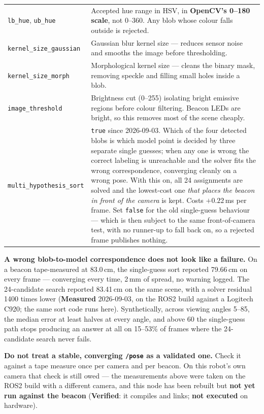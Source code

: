 \documentclass[11pt]{report}
\newenvironment{warningbox}%
  {\begin{lrbox}{\warnbox}\begin{minipage}{0.90\textwidth}}%
  {\end{minipage}\end{lrbox}%
   \begin{center}\fcolorbox{black}{codebg}{\usebox{\warnbox}}\end{center}}
\begin{document}
\begin{center}
\begin{tabular}{p{}p{}}
\texttt{lb\_hue}, \texttt{ub\_hue} & Accepted hue range in HSV, in \textbf{OpenCV's 0--180 scale}, not 0--360. Any blob whose colour falls outside is rejected. \\
\texttt{kernel\_size\_gaussian} & Gaussian blur kernel size --- reduces sensor noise and smooths the image before thresholding. \\
\texttt{kernel\_size\_morph} & Morphological kernel size --- cleans the binary mask, removing speckle and filling small holes inside a blob. \\
\texttt{image\_threshold} & Brightness cut (0--255) isolating bright emissive regions before colour filtering. Beacon LEDs are bright, so this removes most of the scene cheaply. \\
\texttt{multi\_hypothesis\_sort} & \texttt{true} since 2026-09-03. Which of the four detected blobs is which model point is decided by three separate single guesses; when any one is wrong the correct labeling is unreachable and the solver fits the wrong correspondence, converging cleanly on a wrong pose. With this on, all 24 assignments are solved and the lowest-cost one \emph{that places the beacon in front of the camera} is kept. Costs $+0.22$\,ms per frame. Set \texttt{false} for the old single-guess behaviour --- which is then subject to the same front-of-camera test, with no runner-up to fall back on, so a rejected frame publishes nothing. \\
\bottomrule
\end{tabular}
\end{center}

\begin{warningbox}
\textbf{A wrong blob-to-model correspondence does not look like a failure.}
On a beacon tape-measured at 83.0\,cm, the single-guess sort reported
79.66\,cm on every frame --- converging every time, 2\,mm of spread, no
warning logged. The 24-candidate search reported 83.41\,cm on the same
scene, with a solver residual 1400 times lower (\textbf{Measured}
2026-09-03, on the ROS2 build against a Logitech C920; the same sort code
runs here). Synthetically, across viewing angles 5--85\textdegree{}, the
median error at least halves at every angle, and above 60\textdegree{} the
single-guess path stops producing an answer at all on 15--53\% of frames
where the 24-candidate search never fails.

\textbf{Do not treat a stable, converging \texttt{/pose} as a validated
one.} Check it against a tape measure once per camera and per beacon. On
this robot's own camera that check is still owed --- the measurements above
were taken on the ROS2 build with a different camera, and this node has been
rebuilt but \textbf{not yet run against the beacon} (\textbf{Verified}: it
compiles and links; \textbf{not executed} on hardware).
\end{warningbox}
\end{document}

